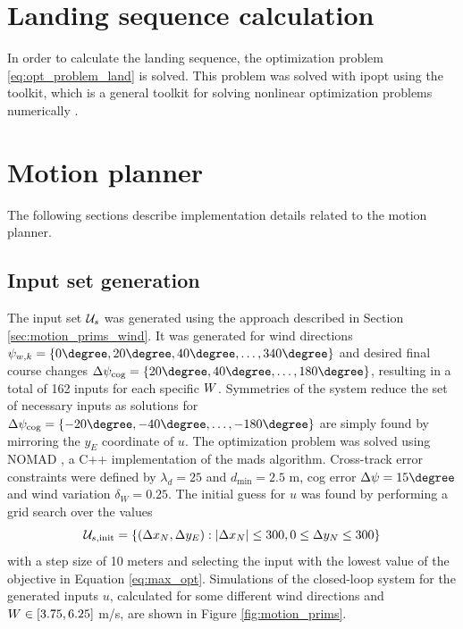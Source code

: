 \section{Landing sequence calculation}
In order to calculate the landing sequence, the optimization problem \eqref{eq:opt_problem_land} is solved. 
This problem was solved with \ac{ipopt} using the  toolkit, which is a general toolkit for solving nonlinear optimization problems numerically \cite{casadi}.

\section{Motion planner}
The following sections describe implementation details related to the motion planner. 
\subsection{Input set generation}
The input set $\mathcal{U}_s$ was generated using the approach described in Section \ref{sec:motion_prims_wind}. 
It was generated for wind directions $\psi_{w,k}=\{0\degree,20\degree,40\degree,\hdots,340\degree\}$ and desired final course changes
$\Delta\cog=\{20\degree,40\degree,\hdots,180\degree\}$, resulting in a total of 162 inputs for each specific $W$. Symmetries of the system reduce the set of necessary inputs
as solutions for $\Delta\cog=\{-20\degree,-40\degree,\hdots,-180\degree\}$ are simply found by mirroring the $y_E$ coordinate of $u$.
The optimization problem was solved using NOMAD \cite{nomad}, a C++ implementation of the \ac{mads} algorithm.
Cross-track error constraints were defined by $\lambda_d=25$ and $d_{\text{min}}=2.5$ m, \ac{cog} error $\Delta\psi=15\degree$ and wind variation $\delta_W=0.25$. The initial guess for $u$ 
was found by performing a grid search over the values
\begin{equation}
    \mathcal{U}_{s,\text{init}}=\{(\Delta x_N,\Delta y_E): |\Delta x_N| \leq 300, 0\leq \Delta y_N \leq 300\}
\end{equation}
with a step size of 10 meters and selecting the input with the lowest value of the objective in Equation \eqref{eq:max_opt}.
Simulations of the closed-loop system for the generated inputs $u$, calculated for some different wind directions and $W\in[3.75, 6.25]$ m/s, are shown in Figure \ref{fig:motion_prims}.
